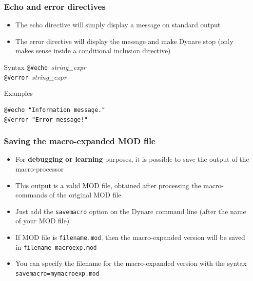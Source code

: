 \documentclass{beamer}
\begin{document}
\begin{frame}[fragile=singleslide]
  \frametitle{Echo and error directives}

  \begin{itemize}
  \item The echo directive will simply display a message on standard output
  \item The error directive will display the message and make Dynare stop (only makes sense inside a conditional inclusion directive)
  \end{itemize}

  \begin{block}{Syntax}
\verb+@#echo +\textit{string\_expr} \\
\verb+@#error +\textit{string\_expr}
  \end{block}

  \begin{block}{Examples}
\begin{verbatim}
@#echo "Information message."
@#error "Error message!"
\end{verbatim}
  \end{block}
\end{frame}

\begin{frame}
  \frametitle{Saving the macro-expanded MOD file}
  \begin{itemize}
  \item For \textbf{debugging or learning} purposes, it is possible to save the output of the macro-processor
  \item This output is a valid MOD file, obtained after processing the macro-commands of the original MOD file
  \item Just add the \texttt{savemacro} option on the Dynare command line (after the name of your MOD file)
  \item If MOD file is \texttt{filename.mod}, then the macro-expanded version will be saved in \texttt{filename-macroexp.mod}
  \item You can specify the filename for the macro-expanded version with the syntax \texttt{savemacro=mymacroexp.mod}
  \end{itemize}
\end{frame}

\end{document}
